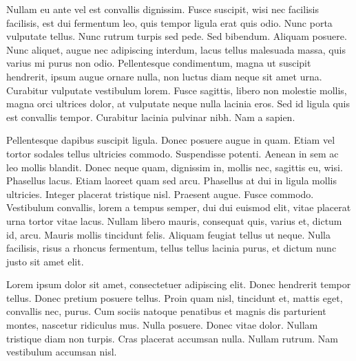 Nullam eu ante vel est convallis dignissim.  Fusce suscipit, wisi nec
facilisis facilisis, est dui fermentum leo, quis tempor ligula erat
quis odio.  Nunc porta vulputate tellus.  Nunc rutrum turpis sed pede.
Sed bibendum.  Aliquam posuere.  Nunc aliquet, augue nec adipiscing
interdum, lacus tellus malesuada massa, quis varius mi purus non odio.
Pellentesque condimentum, magna ut suscipit hendrerit, ipsum augue
ornare nulla, non luctus diam neque sit amet urna.  Curabitur
vulputate vestibulum lorem.  Fusce sagittis, libero non molestie
mollis, magna orci ultrices dolor, at vulputate neque nulla lacinia
eros.  Sed id ligula quis est convallis tempor.  Curabitur lacinia
pulvinar nibh.  Nam a sapien.

Pellentesque dapibus suscipit ligula.  Donec posuere augue in quam.
Etiam vel tortor sodales tellus ultricies commodo.  Suspendisse
potenti.  Aenean in sem ac leo mollis blandit.  Donec neque quam,
dignissim in, mollis nec, sagittis eu, wisi.  Phasellus lacus.  Etiam
laoreet quam sed arcu.  Phasellus at dui in ligula mollis ultricies.
Integer placerat tristique nisl.  Praesent augue.  Fusce commodo.
Vestibulum convallis, lorem a tempus semper, dui dui euismod elit,
vitae placerat urna tortor vitae lacus.  Nullam libero mauris,
consequat quis, varius et, dictum id, arcu.  Mauris mollis tincidunt
felis.  Aliquam feugiat tellus ut neque.  Nulla facilisis, risus a
rhoncus fermentum, tellus tellus lacinia purus, et dictum nunc justo
sit amet elit.

Lorem ipsum dolor sit amet, consectetuer adipiscing elit.  Donec
hendrerit tempor tellus.  Donec pretium posuere tellus.  Proin quam
nisl, tincidunt et, mattis eget, convallis nec, purus.  Cum sociis
natoque penatibus et magnis dis parturient montes, nascetur ridiculus
mus.  Nulla posuere.  Donec vitae dolor.  Nullam tristique diam non
turpis.  Cras placerat accumsan nulla.  Nullam rutrum.  Nam vestibulum
accumsan nisl.
